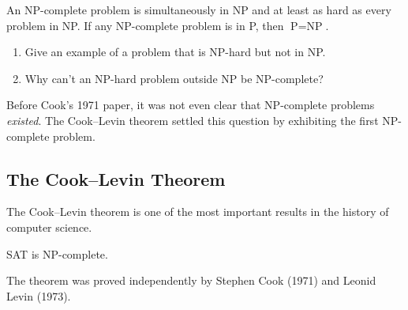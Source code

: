 An NP-complete problem is simultaneously in NP and at least as hard as every problem in NP. If any NP-complete problem is in P, then $\text{P} = \text{NP}$.

\begin{checkyou}
\begin{enumerate}
  \item Give an example of a problem that is NP-hard but not in NP.
  \item Why can't an NP-hard problem outside NP be NP-complete?
\end{enumerate}
\end{checkyou}

\begin{remark}
Before Cook's 1971 paper, it was not even clear that NP-complete problems \emph{existed}. The Cook--Levin theorem settled this question by exhibiting the first NP-complete problem.
\end{remark}

\subsection{The Cook--Levin Theorem}

The Cook--Levin theorem is one of the most important results in the history of computer science.

\begin{theorem}
SAT is NP-complete.
\end{theorem}

The theorem was proved independently by Stephen Cook (1971) and Leonid Levin (1973).


